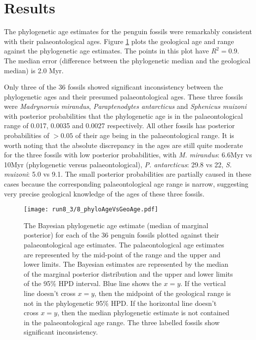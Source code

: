 \documentclass[11pt]{article}
\begin{document}
\section*{Results}

The phylogenetic age estimates for the penguin fossils were remarkably consistent with their palaeontological ages. Figure \ref{fig:phyloAgeVsGeoAge} plots the geological age and range against the phylogenetic age estimates. The points in this plot have $R^2 = 0.9$. The median error (difference between the phylogenetic median and the geological median) is 2.0 Myr.

 Only three of the 36 fossils showed significant inconsistency between the phylogenetic ages and their presumed palaeontological ages. These three fossils were {\em Madrynornis mirandus}, {\em Paraptenodytes antarcticus} and {\em Sphenicus muizoni} with posterior probabilities that the phylogenetic age is in the palaeontological range of 0.017, 0.0035 and 0.0027 respectively. All other fossils has posterior probabilities of $> 0.05$ of their age being in the palaeontological range. It is worth noting that the absolute discrepancy in the ages are still quite moderate for the three fossils with low posterior probabilities, with {\em M. mirandus}: 6.6Myr vs 10Myr (phylogenetic versus palaeontological), {\em P. antarcticus}: 29.8 vs 22, {\em S. muizoni}: 5.0 vs 9.1. The small posterior probabilities are partially caused in these cases because the corresponding palaeontological age range is narrow, suggesting very precise geological knowledge of the ages of these three fossils.

\begin{figure}
\texttt{[image: run8\_3/8\_phyloAgeVsGeoAge.pdf]}
\caption{\label{fig:phyloAgeVsGeoAge}
The Bayesian phylogenetic age estimate (median of marginal posterior) for each of the 36 penguin fossils plotted against their palaeontological age estimates. The palaeontological age estimates are represented by the mid-point of the range and the upper and lower limits. The Bayesian estimates are represented by the median of the marginal posterior distribution and the upper and lower limits of the 95\% HPD interval. Blue line shows the $x=y$. If the vertical line doesn't cross $x=y$, then the midpoint of the geological range is not in the phylogenetic 95\% HPD. If the horizontal line doesn't cross $x=y$, then the median phylogenetic estimate is not contained in the palaeontological age range. The three labelled fossils show significant inconsistency.}
\end{figure}
\end{document}
